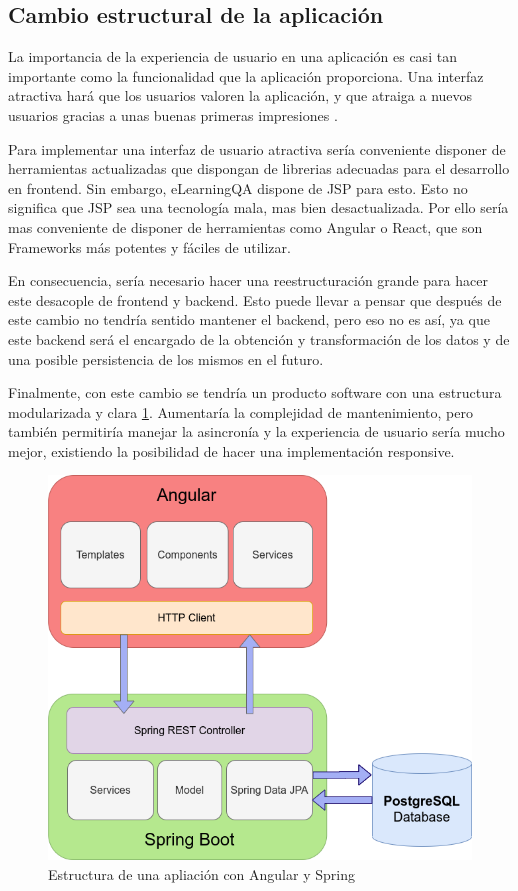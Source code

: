 \subsection{Cambio estructural de la aplicación}
La importancia de la experiencia de usuario en una aplicación es casi tan importante como la funcionalidad que la aplicación proporciona. Una interfaz atractiva hará que los usuarios valoren la aplicación, y que atraiga a nuevos usuarios gracias a unas buenas primeras impresiones \cite{importancia-ux}. 

Para implementar una interfaz de usuario atractiva sería conveniente disponer de herramientas actualizadas que dispongan de librerias adecuadas para el desarrollo en frontend. Sin embargo, eLearningQA dispone de JSP para esto. Esto no significa que JSP sea una tecnología mala, mas bien desactualizada. Por ello sería mas conveniente de disponer de herramientas como Angular o React, que son Frameworks más potentes y fáciles de utilizar.

En consecuencia, sería necesario hacer una reestructuración grande para hacer este desacople de frontend y backend. Esto puede llevar a pensar que después de este cambio no tendría sentido mantener el backend, pero eso no es así, ya que este backend será el encargado de la obtención y transformación de los datos y de una posible persistencia de los mismos en el futuro.

Finalmente, con este cambio se tendría un producto software con una estructura modularizada y clara \ref{fig:aplicacion-dividida}. Aumentaría la complejidad de mantenimiento, pero también permitiría manejar la asincronía y la experiencia de usuario sería mucho mejor, existiendo la posibilidad de hacer una implementación responsive.

\begin{figure}[H]
    \centering
    \includegraphics[width=0.80\linewidth]{img/angularMasSpring.png}
    \caption{Estructura de una apliación con Angular y Spring}
    \label{fig:aplicacion-dividida}
\end{figure}


